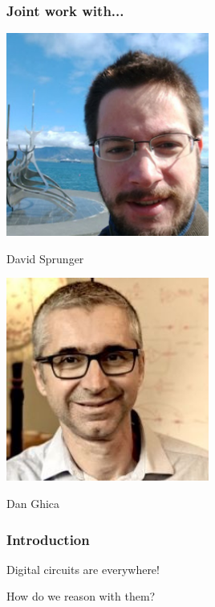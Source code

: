 \begin{frame}
    \frametitle{Joint work with...}

    \begin{minipage}{0.49\textwidth}
        \centering
        \includegraphics[width=0.5\textwidth]{imgs/sprunger}
        
        David Sprunger
    \end{minipage}
    \begin{minipage}{0.49\textwidth}
        \centering
        \includegraphics[width=0.5\textwidth]{imgs/ghica}
        
        Dan Ghica
    \end{minipage}

\end{frame}

\begin{frame}
    \frametitle{Introduction}
    
    Digital circuits are everywhere!

    \wait

    How do we reason with them?

\end{frame}

